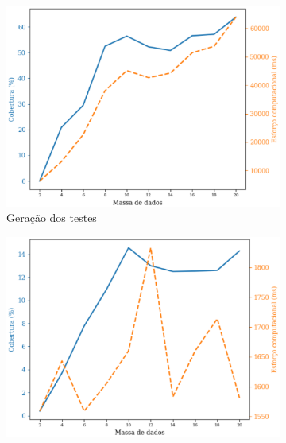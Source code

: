 


\begin{figure}[H]
    \centering
    \begin{subfigure}{.5\textwidth}
        \centering
        \includegraphics[scale=0.5]{figuras/jsoup.parser.htmltreebuilder_generation.eps}
        \caption{Geração dos testes}
        \label{fig:genJsoupHtmlTreeBuilder}
    \end{subfigure}%
    \begin{subfigure}{.5\textwidth}
        \centering
        \includegraphics[scale=0.5]{figuras/jsoup.parser.htmltreebuilder_execution.eps}

\end{subfigure}
\end{figure}
